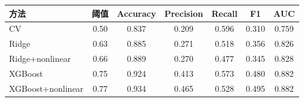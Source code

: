 \begin{tabular}{lcccccc}
\toprule
方法 & 阈值 & Accuracy & Precision & Recall & F1 & AUC \\ 
\midrule
CV & 0.50 & 0.837 & 0.209 & 0.596 & 0.310 & 0.759 \\ 
Ridge & 0.63 & 0.885 & 0.271 & 0.518 & 0.356 & 0.826 \\ 
Ridge+nonlinear & 0.66 & 0.889 & 0.270 & 0.477 & 0.345 & 0.828 \\ 
XGBoost & 0.75 & 0.924 & 0.413 & 0.573 & 0.480 & 0.882 \\ 
XGBoost+nonlinear & 0.77 & 0.934 & 0.465 & 0.528 & 0.495 & 0.882 \\ 
\bottomrule
\end{tabular}
